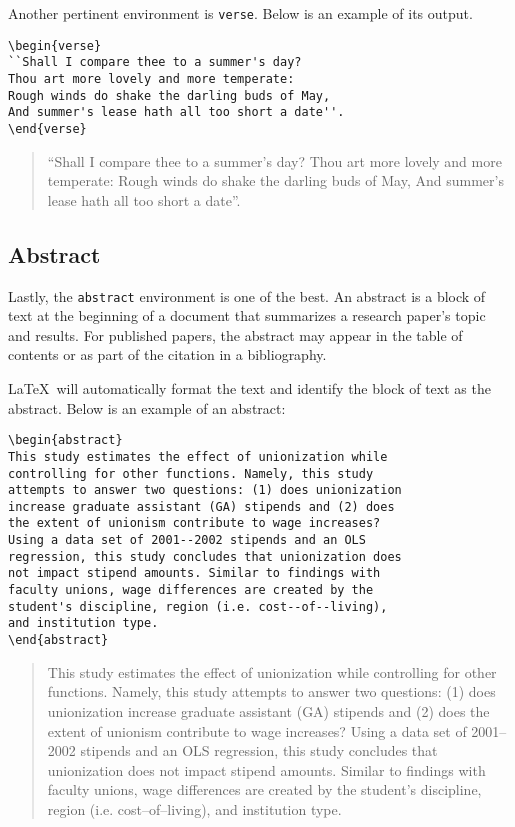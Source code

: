 \documentclass{article}
\begin{document}
Another pertinent environment is \texttt{verse}. Below is an example of its output.
\begin{verbatim}
\begin{verse}
``Shall I compare thee to a summer's day?
Thou art more lovely and more temperate:
Rough winds do shake the darling buds of May,
And summer's lease hath all too short a date''.
\end{verse}
\end{verbatim}
\begin{verse}
``Shall I compare thee to a summer's day?
Thou art more lovely and more temperate:
Rough winds do shake the darling buds of May,
And summer's lease hath all too short a date''.
\end{verse}

\subsection{Abstract}

Lastly, the \texttt{abstract} environment is one of the best. An abstract is a block of text at the beginning of a document that summarizes a research paper's topic and results. For published papers, the abstract may appear in the table of contents or as part of the citation in a bibliography.

\LaTeX\ will automatically format the text and identify the block of text as the abstract. Below is an example of an abstract:
\begin{verbatim}
\begin{abstract}
This study estimates the effect of unionization while 
controlling for other functions. Namely, this study 
attempts to answer two questions: (1) does unionization 
increase graduate assistant (GA) stipends and (2) does 
the extent of unionism contribute to wage increases? 
Using a data set of 2001--2002 stipends and an OLS 
regression, this study concludes that unionization does 
not impact stipend amounts. Similar to findings with 
faculty unions, wage differences are created by the 
student's discipline, region (i.e. cost--of--living), 
and institution type.
\end{abstract}
\end{verbatim}
\begin{abstract}
This study estimates the effect of unionization while 
controlling for other functions. Namely, this study 
attempts to answer two questions: (1) does unionization 
increase graduate assistant (GA) stipends and (2) does 
the extent of unionism contribute to wage increases? 
Using a data set of 2001--2002 stipends and an OLS 
regression, this study concludes that unionization does 
not impact stipend amounts. Similar to findings with 
faculty unions, wage differences are created by the 
student's discipline, region (i.e. cost--of--living), 
and institution type.
\end{abstract}
\end{document}
